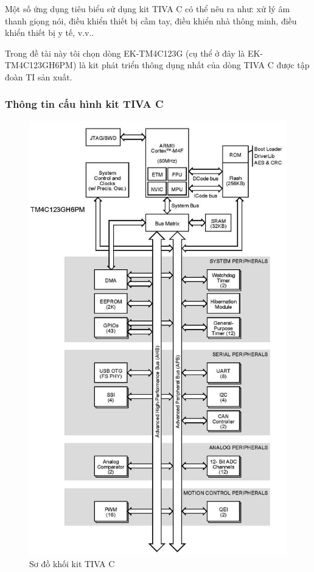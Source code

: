 Một số ứng dụng tiêu biểu sử dụng kit TIVA C có thể nêu ra như: xử lý âm thanh giọng nói, điều khiển thiết bị cầm tay, điều khiển nhà thông minh, điều khiển thiết bị y tế, v.v..

Trong đề tài này tôi chọn dòng EK-TM4C123G (cụ thể ở đây là EK-TM4C123GH6PM) là kit phát triển thông dụng nhất của dòng TIVA C được tập đoàn TI sản xuất.

\subsubsection{Thông tin cấu hình kit TIVA C}
\begin{figure}[ht]
\centering
\includegraphics[scale=0.45]{images/tiva_c_diagram.jpg}
\caption{Sơ đồ khối kit TIVA C}
\end{figure}

